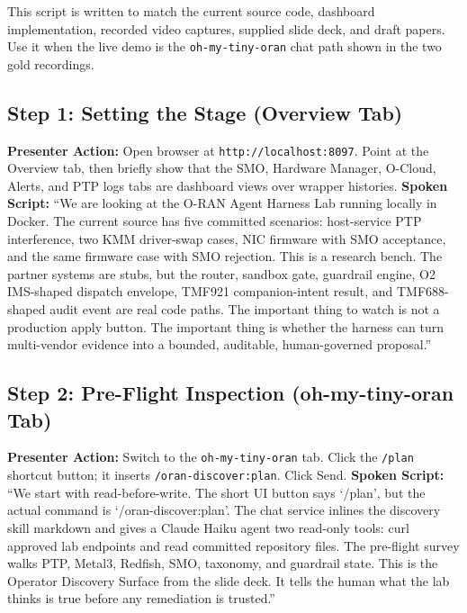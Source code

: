 \documentclass[10pt,a4paper]{article}
\begin{document}
This script is written to match the current source code, dashboard implementation, recorded video captures, supplied slide deck, and draft papers. Use it when the live demo is the \texttt{oh-my-tiny-oran} chat path shown in the two gold recordings.

\subsection*{Step 1: Setting the Stage (Overview Tab)}
\textbf{Presenter Action:} Open browser at \texttt{http://localhost:8097}. Point at the Overview tab, then briefly show that the SMO, Hardware Manager, O-Cloud, Alerts, and PTP logs tabs are dashboard views over wrapper histories.
\newline\textbf{Spoken Script:}
``We are looking at the O-RAN Agent Harness Lab running locally in Docker. The current source has five committed scenarios: host-service PTP interference, two KMM driver-swap cases, NIC firmware with SMO acceptance, and the same firmware case with SMO rejection. This is a research bench. The partner systems are stubs, but the router, sandbox gate, guardrail engine, O2 IMS-shaped dispatch envelope, TMF921 companion-intent result, and TMF688-shaped audit event are real code paths. The important thing to watch is not a production apply button. The important thing is whether the harness can turn multi-vendor evidence into a bounded, auditable, human-governed proposal.''

\subsection*{Step 2: Pre-Flight Inspection (oh-my-tiny-oran Tab)}
\textbf{Presenter Action:} Switch to the \texttt{oh-my-tiny-oran} tab. Click the \texttt{/plan} shortcut button; it inserts \texttt{/oran-discover:plan}. Click Send.
\newline\textbf{Spoken Script:}
``We start with read-before-write. The short UI button says `/plan', but the actual command is `/oran-discover:plan'. The chat service inlines the discovery skill markdown and gives a Claude Haiku agent two read-only tools: curl approved lab endpoints and read committed repository files. The pre-flight survey walks PTP, Metal3, Redfish, SMO, taxonomy, and guardrail state. This is the Operator Discovery Surface from the slide deck. It tells the human what the lab thinks is true before any remediation is trusted.''
\end{document}
